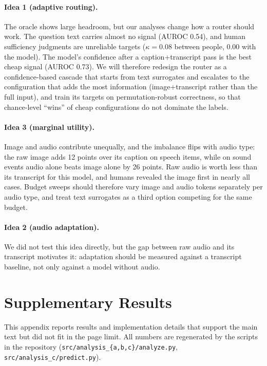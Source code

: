 \documentclass{article}
\begin{document}
\paragraph{Idea 1 (adaptive routing).} The oracle shows large headroom, but our
analyses change how a router should work. The question text carries almost no
signal (AUROC 0.54), and human sufficiency judgments are unreliable targets
($\kappa{=}0.08$ between people, $0.00$ with the model). The model's confidence
after a caption+transcript pass is the best cheap signal (AUROC 0.73). We will
therefore redesign the router as a confidence-based cascade that starts from
text surrogates and escalates to the configuration that adds the most
information (image+transcript rather than the full input), and train its targets
on permutation-robust correctness, so that chance-level ``wins'' of cheap
configurations do not dominate the labels.

\paragraph{Idea 3 (marginal utility).} Image and audio contribute unequally, and
the imbalance flips with audio type: the raw image adds 12 points over its caption
on speech items, while on sound events audio alone beats image alone by 26 points.
Raw audio is worth less than its transcript for this model, and humans revealed
the image first in nearly all cases. Budget sweeps should therefore vary image and
audio tokens separately per audio type, and treat text surrogates as a third
option competing for the same budget.

\paragraph{Idea 2 (audio adaptation).} We did not test this idea directly, but
the gap between raw audio and its transcript motivates it: adaptation should be
measured against a transcript baseline, not only against a model without audio.




\clearpage
\appendix

\section{Supplementary Results}
\label{app:results}

This appendix reports results and implementation details that support the main
text but did not fit in the page limit. All numbers are regenerated by the
scripts in the repository (\texttt{src/analysis\_\{a,b,c\}/analyze.py},
\texttt{src/analysis\_c/predict.py}).
\end{document}
